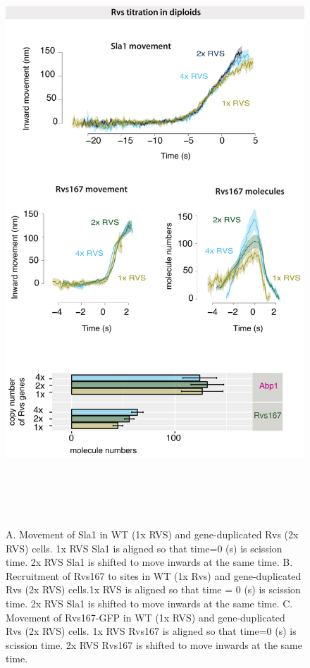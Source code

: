 \newpage
						\begin{figure}[H]
						\centering
						\includegraphics[width=22cm,height=22cm,keepaspectratio]{figures/results_final/protein_friction2}
						\caption[Dynamics of endocytosis in diploid strains with gene duplicated Rvs]
						{A. Movement of Sla1 in WT (1x RVS) and gene-duplicated Rvs (2x RVS) cells. 1x RVS Sla1 is aligned so that time=0 (s) is scission time. 2x RVS Sla1 is shifted to move inwards at the same time.
						B. Recruitment of Rvs167 to sites in WT (1x Rvs)  and gene-duplicated Rvs (2x RVS) cells.1x RVS is aligned so that time = 0 (s) is scission time. 2x RVS Sla1 is shifted to move inwards at the same time.
						C.  Movement of Rvs167-GFP in WT (1x RVS) and gene-duplicated Rvs (2x RVS) cells. 1x RVS Rvs167 is aligned so that time=0 (s) is scission time. 2x RVS Rvs167 is shifted to move inwards at the same time.
						\label{fig_rvsdiploid}}
						\end{figure}
				


